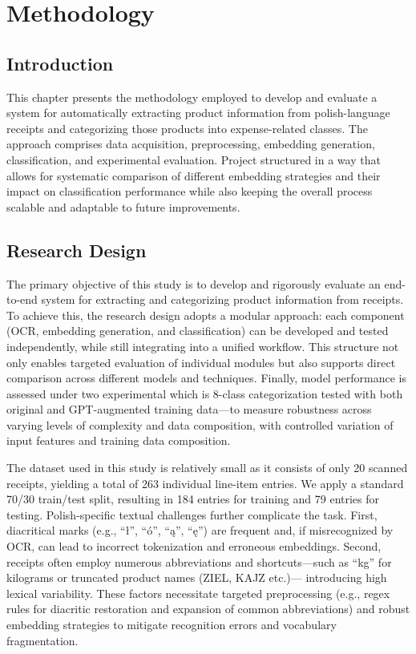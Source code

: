 \documentclass{SGGW-thesis-EN}
\begin{document}
\chapter{Methodology}


\section{Introduction}
This chapter presents the methodology employed to develop and evaluate a system for automatically extracting product information from 
polish-language receipts and categorizing those products into expense-related classes. 
The approach comprises data acquisition, preprocessing, embedding generation, classification, and experimental evaluation. 
Project structured in a way that allows for systematic comparison of different embedding strategies and their impact
 on classification performance while also keeping the overall process scalable and adaptable to future improvements.


\section{Research Design}
The primary objective of this study is to develop and rigorously evaluate an end-to-end system for extracting and categorizing product information from receipts. 
To achieve this, the research design adopts a modular approach: each component (OCR, embedding generation, and classification) can be developed and tested independently, 
while still integrating into a unified workflow. 
This structure not only enables targeted evaluation of individual modules but also supports direct comparison across different models and techniques. 
Finally, model performance is assessed under two experimental which is 8-class categorization tested with both original and GPT-augmented training data—to measure robustness across varying levels of complexity and data composition, 
 with controlled variation of input features and training data composition.

The dataset used in this study is relatively small as it consists of only 20 scanned receipts, yielding a total of 263 individual line‐item entries. 
We apply a standard 70/30 train/test split, resulting in 184 entries for training and 79 entries for testing.
Polish‐specific textual challenges further complicate the task. First, diacritical marks (e.g., “ł”, “ó”, “ą”, “ę”) are frequent and, 
if misrecognized by OCR, can lead to incorrect tokenization and erroneous embeddings. 
Second, receipts often employ numerous abbreviations and shortcuts—such as “kg” for kilograms or truncated product names (ZIEL, KAJZ etc.)—
introducing high lexical variability. These factors necessitate targeted preprocessing 
(e.g., regex rules for diacritic restoration and expansion of common abbreviations) and robust embedding strategies to mitigate recognition errors and vocabulary fragmentation.
\end{document}
